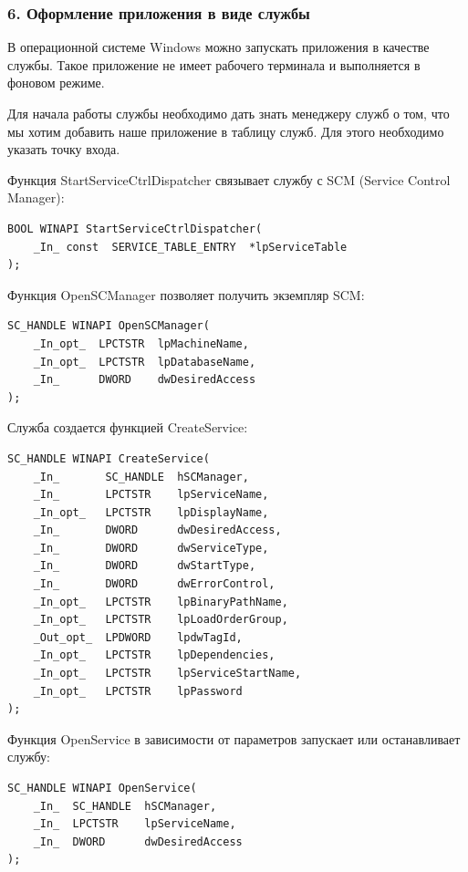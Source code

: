 \documentclass[14pt,a4paper,report]{report}
\begin{document}
\subsubsection{6. Оформление приложения в виде службы}

В операционной системе Windows можно запускать приложения в качестве службы. Такое приложение не имеет рабочего терминала и выполняется в фоновом режиме.

Для начала работы службы необходимо дать знать менеджеру служб о том, что мы хотим добавить наше приложение в таблицу служб. Для этого необходимо указать точку входа.

Функция StartServiceCtrlDispatcher связывает службу с SCM (Service Control Manager):

\begin{verbatim}
BOOL WINAPI StartServiceCtrlDispatcher(
    _In_ const  SERVICE_TABLE_ENTRY  *lpServiceTable
);
\end{verbatim}

Функция OpenSCManager позволяет получить экземпляр SCM:

\begin{verbatim}
SC_HANDLE WINAPI OpenSCManager(
    _In_opt_  LPCTSTR  lpMachineName,
    _In_opt_  LPCTSTR  lpDatabaseName,
    _In_      DWORD    dwDesiredAccess
);
\end{verbatim}

Служба создается функцией CreateService:

\begin{verbatim}
SC_HANDLE WINAPI CreateService(
    _In_       SC_HANDLE  hSCManager,
    _In_       LPCTSTR    lpServiceName,
    _In_opt_   LPCTSTR    lpDisplayName,
    _In_       DWORD      dwDesiredAccess,
    _In_       DWORD      dwServiceType,
    _In_       DWORD      dwStartType,
    _In_       DWORD      dwErrorControl,
    _In_opt_   LPCTSTR    lpBinaryPathName,
    _In_opt_   LPCTSTR    lpLoadOrderGroup,
    _Out_opt_  LPDWORD    lpdwTagId,
    _In_opt_   LPCTSTR    lpDependencies,
    _In_opt_   LPCTSTR    lpServiceStartName,
    _In_opt_   LPCTSTR    lpPassword
);
\end{verbatim}

Функция OpenService в зависимости от параметров запускает или останавливает службу:

\begin{verbatim}
SC_HANDLE WINAPI OpenService(
    _In_  SC_HANDLE  hSCManager,
    _In_  LPCTSTR    lpServiceName,
    _In_  DWORD      dwDesiredAccess
);
\end{verbatim}
\end{document}

